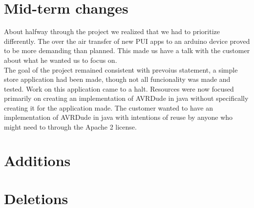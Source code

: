 \section{Mid-term changes}
About halfway through the project we realized that we had to prioritize differently. The over the air transfer of new PUI apps to an arduino device proved to be more demanding than planned. This made us have a talk with the customer about what he wanted us to focus on. \\
\newline
The goal of the project remained consistent with prevoius statement, a simple store application had been made, though not all funcionality was made and tested. Work on this application came to a halt. Resources were now focused primarily on creating an implementation of AVRDude in java without specifically creating it for the application made. The customer wanted to have an implementation of AVRDude in java with intentions of reuse by anyone who might need to through the Apache 2 license. 

\section{Additions}


\section{Deletions}
